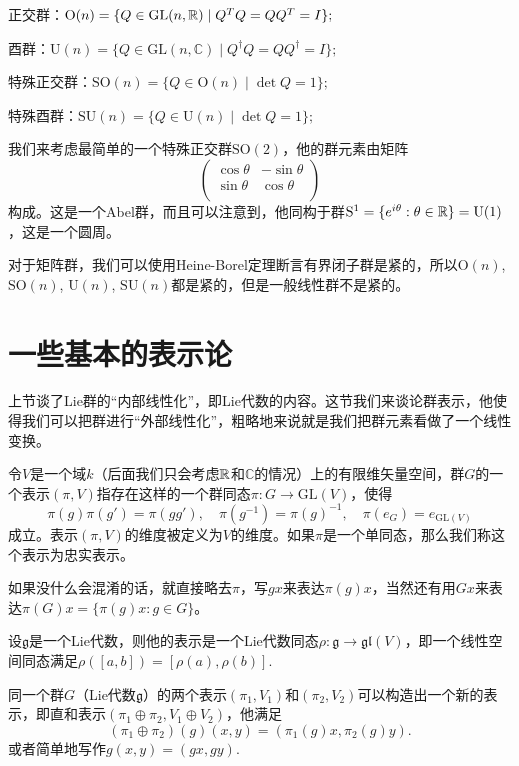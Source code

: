 \documentclass[9pt]{extarticle}
\newcommand{\cc}{\mathbb{C}}
\newcommand{\lag}{{\mathfrak{g}}}
\begin{document}
 正交群：$\mathrm{O}(n) = \{ Q \in \mathrm{GL}(n,\mathbb{R}) \mid Q^T Q = Q Q^T = I \};$

 酉群：$\mathrm{U}(n) = \{ Q \in \mathrm{GL}(n,\cc) \mid Q^\dag Q = Q Q^\dag = I \};$

 特殊正交群：$\mathrm{SO}(n) =\{ Q \in \mathrm{O}(n) \mid \det Q=1 \};$

 特殊酉群：$\mathrm{SU}(n) =\{ Q \in \mathrm{U}(n) \mid \det Q=1 \};$

我们来考虑最简单的一个特殊正交群$\mathrm{SO}(2)$，他的群元素由矩阵
\[
	\begin{pmatrix}
	\cos \theta&-\sin \theta\\
	\sin \theta&\cos \theta\\
	\end{pmatrix}
\]
构成。这是一个Abel群，而且可以注意到，他同构于群$\mathrm{S}^1=\{e^{i\theta}:\theta\in\mathbb{R}\}=\mathrm{U}(1)$，这是一个圆周。

\para 对于矩阵群，我们可以使用Heine-Borel定理断言有界闭子群是紧的，所以$\mathrm{O}(n)$, $\mathrm{SO}(n)$, $\mathrm{U}(n)$, $\mathrm{SU}(n)$都是紧的，但是一般线性群不是紧的。

\section{一些基本的表示论}

上节谈了Lie群的“内部线性化”，即Lie代数的内容。这节我们来谈论群表示，他使得我们可以把群进行“外部线性化”，粗略地来说就是我们把群元素看做了一个线性变换。

\para 令$V$是一个域$k$（后面我们只会考虑$\mathbb{R}$和$\cc$的情况）上的有限维矢量空间，群$G$的一个表示$(\pi, V)$指存在这样的一个群同态$\pi:G\rightarrow \mathrm{GL}(V)$，使得
\[
	\pi(g)\pi(g')=\pi(gg'),\quad \pi(g^{-1})=\pi(g)^{-1},\quad \pi(e_G)=e_{\mathrm{GL}(V)}
\]
成立。表示$(\pi, V)$的维度被定义为$V$的维度。如果$\pi$是一个单同态，那么我们称这个表示为忠实表示。

如果没什么会混淆的话，就直接略去$\pi$，写$gx$来表达$\pi(g)x$，当然还有用$Gx$来表达$\pi(G)x=\{\pi(g)x:g\in G\}$。

设$\lag$是一个Lie代数，则他的表示是一个Lie代数同态$\rho:\lag \to \mathfrak{gl}(V)$，即一个线性空间同态满足$\rho([a,b])=[\rho(a),\rho(b)]$.

\para 同一个群$G$（Lie代数$\lag$）的两个表示$(\pi_1,V_1)$和$(\pi_2,V_2)$可以构造出一个新的表示，即直和表示$(\pi_1\oplus \pi_2,V_1\oplus V_2)$，他满足
\[
	(\pi_1\oplus \pi_2)(g)(x,y)=(\pi_1(g)x,\pi_2(g)y).
\]
或者简单地写作$g(x,y)=(gx,gy)$.
\end{document}
